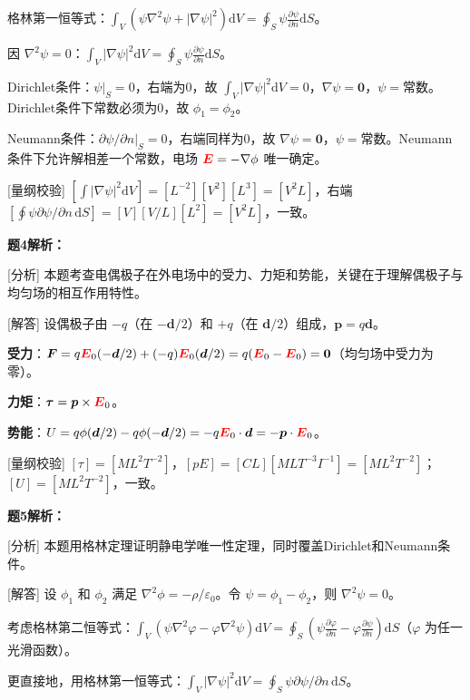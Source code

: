 \documentclass[11pt,a4paper,openany,oneside]{book}
\newcommand{\diff}{\mathrm{d}}
\newcommand{\vecE}{\textcolor{red}{\vect{E}}}
\newcommand{\eps}{\varepsilon}
\newcommand{\vect}[1]{\bm{#1}}
\newcommand{\grad}{\nabla}
\newcommand{\lap}{\nabla^2}
\begin{document}
格林第一恒等式：$\int_V (\psi\lap\psi + |\grad\psi|^2)\diff V = \oint_S \psi\frac{\partial\psi}{\partial n}\diff S$。

因 $\lap\psi = 0$：$\int_V |\grad\psi|^2\diff V = \oint_S \psi\frac{\partial\psi}{\partial n}\diff S$。

Dirichlet条件：$\psi|_S = 0$，右端为0，故 $\int_V |\grad\psi|^2\diff V = 0$，$\grad\psi = \vect{0}$，$\psi = \text{常数}$。Dirichlet条件下常数必须为0，故 $\phi_1 = \phi_2$。

Neumann条件：$\partial\psi/\partial n|_S = 0$，右端同样为0，故 $\grad\psi = \vect{0}$，$\psi = \text{常数}$。Neumann条件下允许解相差一个常数，电场 $\vecE = -\grad\phi$ 唯一确定。\qedsymbol

[量纲校验] $[\int|\grad\psi|^2\diff V] = [L^{-2}][V^2][L^3] = [V^2L]$，右端 $[\oint\psi\partial\psi/\partial n\,\diff S] = [V][V/L][L^2] = [V^2L]$，一致。\qedsymbol

\textbf{题4解析：}

[分析] 本题考查电偶极子在外电场中的受力、力矩和势能，关键在于理解偶极子与均匀场的相互作用特性。

[解答] 设偶极子由 $-q$（在 $-\vect{d}/2$）和 $+q$（在 $\vect{d}/2$）组成，$\vect{p} = q\vect{d}$。

\textbf{受力}：$\vect{F} = q\vecE_0(-\vect{d}/2) + (-q)\vecE_0(\vect{d}/2) = q(\vecE_0 - \vecE_0) = \vect{0}$（均匀场中受力为零）。

\textbf{力矩}：$\vect{\tau} = \vect{p} \times \vecE_0$。

\textbf{势能}：$U = q\phi(\vect{d}/2) - q\phi(-\vect{d}/2) = -q\vecE_0\cdot\vect{d} = -\vect{p}\cdot\vecE_0$。\qedsymbol

[量纲校验] $[\tau] = [ML^2T^{-2}]$，$[pE] = [CL][MLT^{-3}I^{-1}] = [ML^2T^{-2}]$；$[U] = [ML^2T^{-2}]$，一致。\qedsymbol

\textbf{题5解析：}

[分析] 本题用格林定理证明静电学唯一性定理，同时覆盖Dirichlet和Neumann条件。

[解答] 设 $\phi_1$ 和 $\phi_2$ 满足 $\lap\phi = -\rho/\eps_0$。令 $\psi = \phi_1 - \phi_2$，则 $\lap\psi = 0$。

考虑格林第二恒等式：$\int_V (\psi\lap\varphi - \varphi\lap\psi)\diff V = \oint_S \left(\psi\frac{\partial\varphi}{\partial n} - \varphi\frac{\partial\psi}{\partial n}\right)\diff S$（$\varphi$ 为任一光滑函数）。

更直接地，用格林第一恒等式：$\int_V |\grad\psi|^2\diff V = \oint_S \psi\partial\psi/\partial n\,\diff S$。
\end{document}
